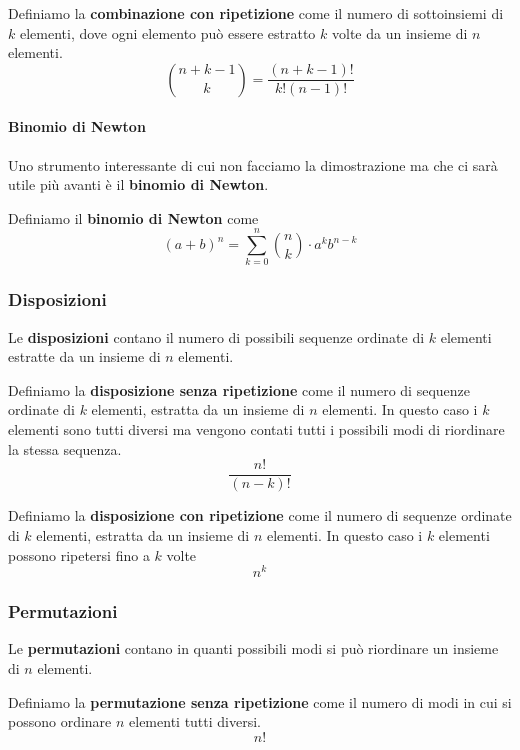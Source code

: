 \begin{definition}
	Definiamo la \textbf{combinazione con ripetizione} come il numero di sottoinsiemi di $k$
	elementi, dove ogni elemento può essere estratto $k$ volte da un insieme di $n$ elementi.
	\[ \binom{n+k-1}{k} = \frac{(n + k - 1)!}{k! (n-1)!} \]
\end{definition}

\paragraph{Binomio di Newton}
Uno strumento interessante di cui non facciamo la dimostrazione ma che ci sarà utile più avanti è
il \textbf{binomio di Newton}.

\begin{definition}
	Definiamo il \textbf{binomio di Newton} come
	\[ (a + b)^n = \sum_{k=0}^n \binom{n}{k} \cdot a^k b^{n-k} \]
\end{definition}

\subsubsection{Disposizioni}
Le \textbf{disposizioni} contano il numero di possibili sequenze ordinate di $k$ elementi estratte
da un insieme di $n$ elementi.

\begin{definition}
	Definiamo la \textbf{disposizione senza ripetizione} come il numero di sequenze ordinate di $k$
	elementi, estratta da un insieme di $n$ elementi. In questo caso i $k$ elementi sono tutti
	diversi ma vengono contati tutti i possibili modi di riordinare la stessa sequenza.
	\[ \frac{n!}{(n - k)!} \]
\end{definition}

\begin{definition}
	Definiamo la \textbf{disposizione con ripetizione} come il numero di sequenze ordinate di $k$
	elementi, estratta da un insieme di $n$ elementi. In questo caso i $k$ elementi possono
	ripetersi fino a $k$ volte
	\[ n^k \]
\end{definition}

\subsubsection{Permutazioni}
Le \textbf{permutazioni} contano in quanti possibili modi si può riordinare un insieme di $n$
elementi.

\begin{definition}
	Definiamo la \textbf{permutazione senza ripetizione} come il numero di modi in cui si possono
	ordinare $n$ elementi tutti diversi.
	\[ n! \]
\end{definition}

